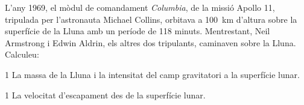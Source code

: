 L'any 1969, el mòdul de comandament \textit{Columbia}, de la missió Apollo 11, tripulada per l'astronauta Michael Collins, orbitava a 100~km d'altura sobre la superfície de la Lluna amb un període de 118 minuts. Mentrestant, Neil Armstrong i Edwin Aldrin, els altres dos tripulants, caminaven sobre la Lluna. Calculeu:


\begin{apartat}{1}
La massa de la Lluna i la intensitat del camp gravitatori a la superfície lunar.
\end{apartat}

\begin{apartat}{1}
La velocitat d'escapament des de la superfície lunar.
\end{apartat}

